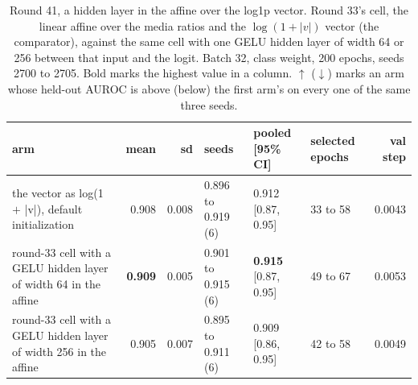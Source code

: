 \begin{table}[H]
  \centering
  \scriptsize
  \setlength{\tabcolsep}{3pt}
  \caption[Round 41, a hidden layer in the affine over the log1p vector]{Round 41, a hidden layer in the affine over the log1p vector. Round 33's cell, the linear affine over the media ratios and the $\log(1 + |v|)$ vector (the comparator), against the same cell with one GELU hidden layer of width 64 or 256 between that input and the logit. Batch 32, class weight, 200 epochs, seeds 2700 to 2705. Bold marks the highest value in a column. $\uparrow$ ($\downarrow$) marks an arm whose held-out AUROC is above (below) the first arm's on every one of the same three seeds.}
  \label{tab:w57}
  \begin{tabular}{@{}lrrlllr@{}}
    \hline
    arm & mean & sd & seeds & pooled [95\% CI] & selected epochs & val step \\
    \hline
    the vector as log(1 $+$ |v|), default initialization & 0.908 & 0.008 & 0.896 to 0.919 (6) & 0.912 [0.87, 0.95] & 33 to 58 & 0.0043 \\
    round-33 cell with a GELU hidden layer of width 64 in the affine & \textbf{0.909} & 0.005 & 0.901 to 0.915 (6) & \textbf{0.915} [0.87, 0.95] & 49 to 67 & 0.0053 \\
    round-33 cell with a GELU hidden layer of width 256 in the affine & 0.905 & 0.007 & 0.895 to 0.911 (6) & 0.909 [0.86, 0.95] & 42 to 58 & 0.0049 \\
    \hline
  \end{tabular}
\end{table}
